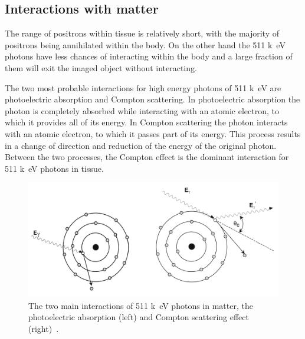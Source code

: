 \begin{table}[htbp]
  \caption{Commonly used radioisotopes and their relevant characteristics for PET imaging.}
\label{tab:radioisotopes}%
\end{table}%

\subsection{Interactions with matter}
The range of positrons within tissue is relatively short, with the majority of positrons being annihilated within the body.
On the other hand the 511 \si{k\electronvolt} photons have less chances of interacting within the body and a large fraction of them will exit the imaged object without interacting. 

The two most probable interactions for high energy photons of 511 \si{k\electronvolt} are photoelectric absorption and Compton scattering. In photoelectric absorption the photon is completely absorbed while interacting with an atomic electron, to which it provides all of its energy. In Compton scattering the photon interacts with an atomic electron, to which it passes part of its energy. This process results in a change of direction and reduction of the energy of the original photon. Between the two processes, the Compton effect is the dominant interaction for 511 \si{k\electronvolt} photons in tissue. 
%
\begin{figure} [h!]
\centering
\includegraphics[scale=0.45,angle=0]{2_Theory_Methods/figures/Bailey_gamma_interactions.png}
\caption{The two main interactions of 511 \si{k\electronvolt} photons in matter, the photoelectric absorption (left) and Compton scattering effect (right)~\cite{Bailey2005}.} 
\label{fig_2:511_interactions}
\end{figure} 
%
